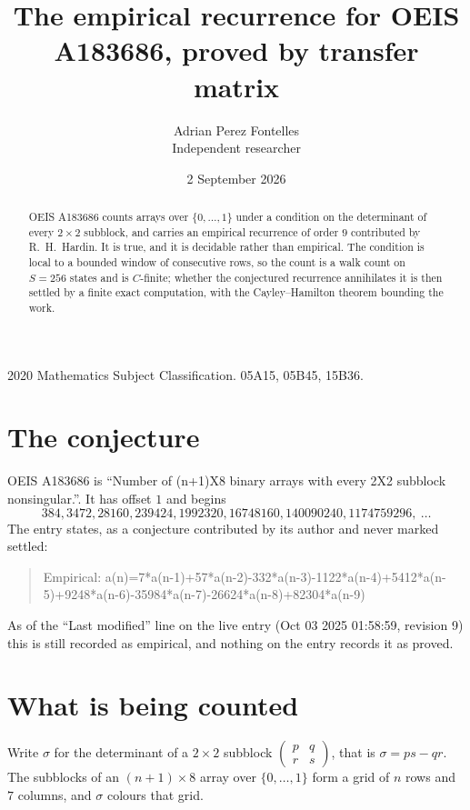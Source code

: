 \documentclass[11pt,a4paper]{article}
\title{The empirical recurrence for OEIS A183686, proved by transfer matrix}
\author{Adrian Perez Fontelles\\ \small Independent researcher}
\date{2 September 2026}
\theoremstyle{plain}
\theoremstyle{definition}
\begin{document}
\maketitle

\begin{abstract}
OEIS A183686 counts arrays over $\{0,\dots,1\}$ under a condition on the determinant of every
$2\times2$ subblock, and carries an empirical recurrence of order $9$ contributed by
R.~H.~Hardin. It is true, and it is decidable rather than empirical. The condition is local to
a bounded window of consecutive rows, so the count is a walk count on $S=256$ states and is
$C$-finite; whether the conjectured recurrence annihilates it is then settled by a finite exact
computation, with the Cayley--Hamilton theorem bounding the work.
\end{abstract}

\noindent\small 2020 Mathematics Subject Classification. 05A15, 05B45, 15B36.\normalsize

\section{The conjecture}

OEIS A183686 is ``Number of (n+1)X8 binary arrays with every 2X2 subblock nonsingular.''. It has offset $1$ and begins
\[
384, 3472, 28160, 239424, 1992320, 16748160, 140090240, 1174759296,\ \dots
\]
The entry states, as a conjecture contributed by its author and never marked settled:
\begin{quote}
Empirical: a(n)=7*a(n-1)+57*a(n-2)-332*a(n-3)-1122*a(n-4)+5412*a(n-5)+9248*a(n-6)-35984*a(n-7)-26624*a(n-8)+82304*a(n-9)
\end{quote}
As of the ``Last modified'' line on the live entry (Oct 03 2025 01:58:59, revision 9) this is still
recorded as empirical, and nothing on the entry records it as proved.

\section{What is being counted}

Write $\sigma$ for the determinant of a $2\times2$ subblock
$\begin{pmatrix}p&q\\r&s\end{pmatrix}$, that is $\sigma=ps-qr$. The subblocks of an
$(n+1)\times8$ array over $\{0,\dots,1\}$ form a grid of $n$ rows and $7$
columns, and $\sigma$ colours that grid.
\end{document}
